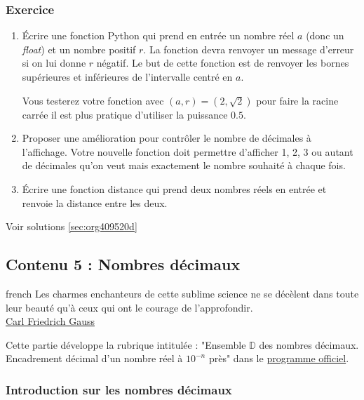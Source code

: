 \documentclass[a4paper, 11pt, twoside]{article}
\newcommand{\E}[1]{\mathbb{#1}}
\begin{document}
\subsubsection{Exercice}
\label{sec:org48657a1}
\begin{enumerate}
\item Écrire une fonction Python qui prend en entrée un nombre réel
\(a\) (donc un \emph{float}) et un nombre positif \(r\). La fonction
devra renvoyer un message d'erreur si on lui donne \(r\)
négatif. Le but de cette fonction est de renvoyer les bornes
supérieures et inférieures de l'intervalle centré en \(a\).

Vous testerez votre fonction avec \((a, r) = (2, \sqrt{2})\) pour
faire la racine carrée il est plus pratique d'utiliser la
puissance \(0.5\).
\item Proposer une amélioration pour contrôler le nombre de décimales
à l'affichage. Votre nouvelle fonction doit permettre
d'afficher 1, 2, 3 ou autant de décimales qu'on veut mais
exactement le nombre souhaité à chaque fois.
\item Écrire une fonction distance qui prend deux nombres réels en
entrée et renvoie la distance entre les deux.
\end{enumerate}


Voir solutions \ref{sec:org409520d}
\stopcontents[level-2]

\subsection{Contenu 5 : Nombres décimaux}
\label{sec:org38c43bc}

\begin{foreigndisplayquote}{french}
Les charmes enchanteurs de cette sublime science ne se décèlent
dans toute leur beauté qu'à ceux qui ont le courage de
l'approfondir.\\

\href{https://fr.wikipedia.org/wiki/Carl\_Friedrich\_Gauss}{Carl Friedrich Gauss}
\end{foreigndisplayquote}


\startcontents[level-2]

Cette partie développe la rubrique intitulée : "Ensemble \(\E{D}\) des
nombres décimaux. Encadrement décimal d'un nombre réel à \(10^{-n}\)
près" dans le \href{https://eduscol.education.fr/document/24553/download}{programme officiel}.

\subsubsection{Introduction sur les nombres décimaux}
\label{sec:orgec30c5d}
\end{document}
